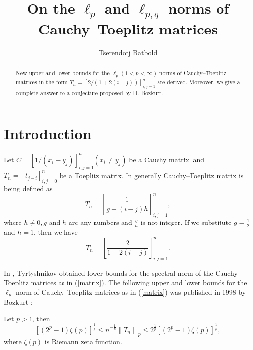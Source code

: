 \documentclass{amsart}
\begin{document}
\title{On the $\ell_p$ and $\ell_{p,q}$ norms of Cauchy--Toeplitz matrices}
\author[Ts. Batbold]{Tserendorj Batbold}
\address{
Department of Mathematics\\
National University of Mongolia\\
Ulaanbaatar 14201\\
Mongolia}

\begin{abstract} New upper and lower bounds for the $\ell_p (1<p<\infty)$ norms of  Cauchy--Toeplitz matrices in the form $T_n=[2/(1+2(i-j))]_{i,j=1}^n$ are derived.
    Moreover, we give a complete answer to a conjecture proposed by D. Bozkurt.
\end{abstract}
\maketitle
\section{Introduction}
Let $C=\left[1 /\left(x_i-y_j\right)\right]_{i, j=1}^n\left(x_i \neq y_j\right)$ be a Cauchy matrix, and $T_n=\left[t_{j-i}\right]_{i, j=0}^n$ be a Toeplitz matrix. In generally Cauchy--Toeplitz matrix is being defined as
$$
T_n=\left[\frac{1}{g+(i-j) h}\right]_{i, j=1}^n,
$$
where $h \neq 0, g$ and $h$ are any numbers and $\frac{g}{h}$ is not integer. If we substitute $g=\frac{1}{2}$ and $h=1$, then we have
\begin{equation}\label{matrix}
   T_n=\left[\frac{2}{1+2(i-j)}\right]_{i, j=1}^n.
\end{equation}

In \cite{tyr}, Tyrtyshnikov obtained lower bounds for the spectral norm of the Cauchy--Toeplitz matrices as in (\ref{matrix}). The following upper and lower bounds for the $\ell_p$ norm of Cauchy--Toeplitz matrices as in (\ref{matrix}) was published in 1998 by Bozkurt \cite{bozkurt1}:

Let $p>1$, then 
\begin{equation}\label{bozkurteq1}
\left[\left(2^p-1\right) \zeta(p)\right]^{\frac{1}{p}} \leq n^{-\frac{1}{p}}\left\|T_n\right\|_p \leq 2^{\frac{1}{p}}\left[\left(2^p-1\right) \zeta(p)\right]^{\frac{1}{p}},
\end{equation}
where $\zeta(p)$ is Riemann zeta function.
\end{document}
